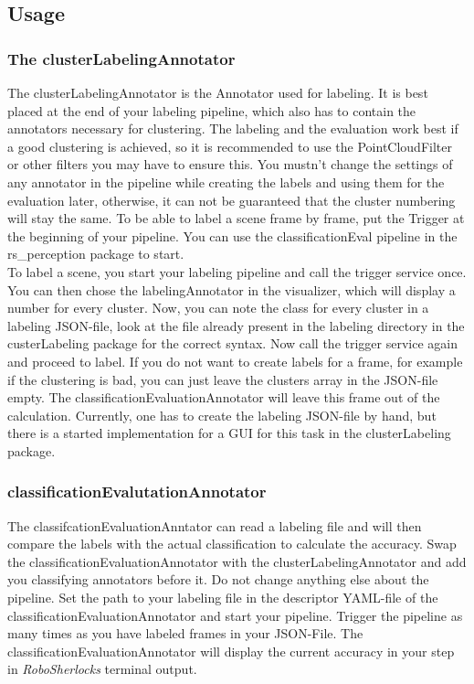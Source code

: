 \documentclass[main.tex]{subfiles}
\begin{document}
\subsection{Usage}

\subsubsection{The clusterLabelingAnnotator}
The clusterLabelingAnnotator is the Annotator used for labeling. It is best placed at the end of your labeling pipeline, which also has to contain the annotators necessary for clustering. The labeling and the evaluation work best if a good clustering is achieved, so it is recommended to use the PointCloudFilter or other filters you may have to ensure this. You mustn't change the settings of any annotator in the pipeline while creating the labels and using them for the evaluation later, otherwise, it can not be guaranteed that the cluster numbering will stay the same. To be able to label a scene frame by frame, put the Trigger at the beginning of your pipeline. You can use the classificationEval pipeline in the rs\_perception package to start.\\

To label a scene, you start your labeling pipeline and call the trigger service once. You can then chose the labelingAnnotator in the visualizer, which will display a number for every cluster. Now, you can note the class for every cluster in a labeling JSON-file, look at the file already present in the labeling directory in the custerLabeling package for the correct syntax. Now call the trigger service again and proceed to label. If you do not want to create labels for a frame, for example if the clustering is bad, you can just leave the clusters array in the JSON-file empty. The classificationEvaluationAnnotator will leave this frame out of the calculation. Currently, one has to create the labeling JSON-file by hand, but there is a started implementation for a GUI for this task in the clusterLabeling package.

\subsubsection{classificationEvalutationAnnotator}
The classifcationEvaluationAnntator can read a labeling file and will then compare the labels with the actual classification to calculate the accuracy. Swap the classificationEvaluationAnnotator with the clusterLabelingAnnotator and add you classifying annotators before it. Do not change anything else about the pipeline. Set the path to your labeling file in the descriptor YAML-file of the classificationEvaluationAnnotator and start your pipeline. Trigger the pipeline as many times as you have labeled frames in your JSON-File. The classificationEvaluationAnnotator will display the current accuracy in your step in \textit{RoboSherlocks} terminal output. 
\end{document}
